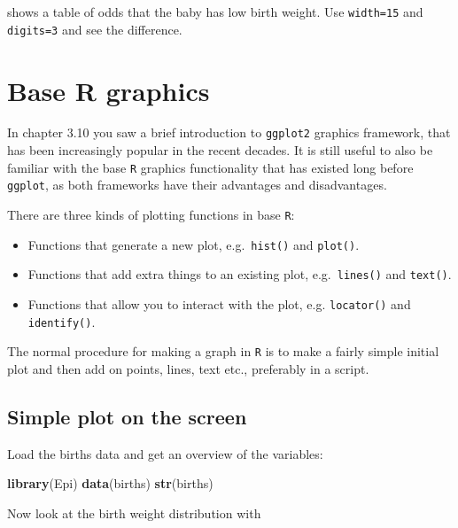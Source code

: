 \documentclass[
]{book}
\newenvironment{Shaded}{\begin{snugshade}}{\end{snugshade}}
\newcommand{\FunctionTok}[1]{\textcolor[rgb]{0.13,0.29,0.53}{\textbf{#1}}}
\newcommand{\NormalTok}[1]{#1}
\newcommand{\SpecialCharTok}[1]{\textcolor[rgb]{0.81,0.36,0.00}{\textbf{#1}}}
\providecommand{\tightlist}{%
  \setlength{\itemsep}{0pt}\setlength{\parskip}{0pt}}
\begin{document}
shows a table of odds that the baby has low birth weight. Use
\texttt{width=15} and \texttt{digits=3} and see the difference.

\chapter{Base R graphics}\label{base-r-graphics}

In chapter 3.10 you saw a brief introduction to \texttt{ggplot2} graphics framework, that has been increasingly popular in the recent decades. It is still useful to also be familiar with the base \texttt{R} graphics functionality that has existed long before \texttt{ggplot}, as both frameworks have their advantages and disadvantages.

There are three kinds of plotting functions in base \texttt{R}:

\begin{itemize}
\tightlist
\item
  Functions that generate a new plot, e.g.~\texttt{hist()} and
  \texttt{plot()}.
\item
  Functions that add extra things to an existing plot,
  e.g.~\texttt{lines()} and \texttt{text()}.
\item
  Functions that allow you to interact with the plot, e.g.
  \texttt{locator()} and \texttt{identify()}.
\end{itemize}

The normal procedure for making a graph in \texttt{R} is to make a fairly
simple initial plot and then add on points, lines, text etc.,
preferably in a script.

\section{Simple plot on the screen}\label{simple-plot-on-the-screen}

Load the births data and get an overview of the variables:

\begin{Shaded}
\begin{Highlighting}[]
\FunctionTok{library}\NormalTok{(Epi)}
\FunctionTok{data}\NormalTok{(births)}
\FunctionTok{str}\NormalTok{(births)}
\end{Highlighting}
\end{Shaded}

Now look at the birth weight distribution with

\begin{Shaded}
\end{Shaded}
\end{document}
